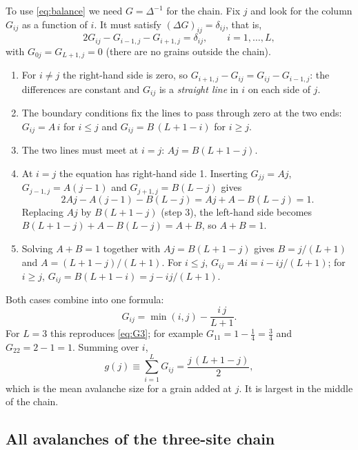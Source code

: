 To use \cref{eq:balance} we need $G=\Delta^{-1}$ for the chain. Fix $j$ and look for the column $G_{ij}$ as a function of $i$.
It must satisfy $(\Delta G)_{ij} = \delta_{ij}$, that is,
\begin{equation}
  2G_{ij} - G_{i-1,j} - G_{i+1,j} = \delta_{ij},\qquad i=1,\dots,L,
  \label{eq:G-eq}
\end{equation}
with $G_{0j} = G_{L+1,j} = 0$ (there are no grains outside the chain).
\begin{enumerate}
  \item For $i\neq j$ the right-hand side is zero, so $G_{i+1,j}-G_{ij} = G_{ij}-G_{i-1,j}$: the differences are constant
    and $G_{ij}$ is a \emph{straight line} in $i$ on each side of $j$.
  \item The boundary conditions fix the lines to pass through zero at the two ends:
    $G_{ij} = A\,i$ for $i\le j$ and $G_{ij} = B\,(L+1-i)$ for $i\ge j$.
  \item The two lines must meet at $i=j$: $A j = B(L+1-j)$.
  \item At $i=j$ the equation has right-hand side 1. Inserting $G_{jj}=Aj$, $G_{j-1,j}=A(j-1)$ and
    $G_{j+1,j}=B(L-j)$ gives
    \[
      2Aj - A(j-1) - B(L-j) = Aj + A - B(L-j) = 1 .
    \]
    Replacing $Aj$ by $B(L+1-j)$ (step 3), the left-hand side becomes $B(L+1-j) + A - B(L-j) = A + B$, so $A+B = 1$.
  \item Solving $A+B=1$ together with $Aj = B(L+1-j)$ gives $B = j/(L+1)$ and $A = (L+1-j)/(L+1)$. For $i\le j$,
    $G_{ij} = Ai = i - ij/(L+1)$; for $i\ge j$, $G_{ij} = B(L+1-i) = j - ij/(L+1)$.
\end{enumerate}
Both cases combine into one formula:
\begin{equation}
  G_{ij} = \min(i,j) - \frac{i\,j}{L+1}.
  \label{eq:G1d}
\end{equation}
For $L=3$ this reproduces \cref{eq:G3}; for example $G_{11} = 1 - \tfrac14 = \tfrac34$ and $G_{22} = 2-1 = 1$. Summing over $i$,
\begin{equation}
  g(j) \equiv \sum_{i=1}^{L} G_{ij} = \frac{j\,(L+1-j)}{2},
  \label{eq:g1d}
\end{equation}
which is the mean avalanche size for a grain added at $j$. It is largest in the middle of the chain.

\subsection{All avalanches of the three-site chain}

